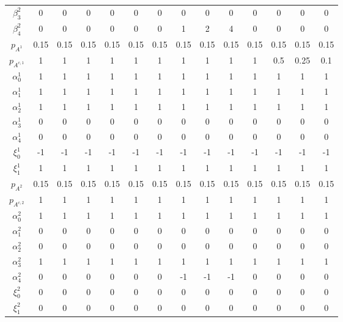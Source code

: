 \documentclass[12pt,a4paper]{article}
\theoremstyle{definition}
\begin{document}
\begin{table}
\begin{threeparttable}
\begin{tabular}{c c c c c c c c c c c c c c}
      $\beta^2_3$ & 0 & 0 & 0 & 0 & 0 & 0 & 0 & 0 & 0 & 0 & 0 & 0 & 0 \\
      $\beta^2_4$ & 0 & 0 & 0 & 0 & 0 & 0 & 1 & 2 & 4 & 0 & 0 & 0 & 0 \\
      $p_{A^{1}}$ & 0.15 & 0.15 & 0.15 & 0.15 & 0.15 & 0.15 & 0.15 & 0.15 & 0.15 & 0.15 & 0.15 & 0.15 & 0.15 \\
      $p_{A^{c, 1}}$ & 1 & 1 & 1 & 1 & 1 & 1 & 1 & 1 & 1 & 1 & 0.5 & 0.25 & 0.1 \\
      $\alpha^1_0$ & 1 & 1 & 1 & 1 & 1 & 1 & 1 & 1 & 1 & 1 & 1 & 1 & 1 \\
      $\alpha^1_1$ & 1 & 1 & 1 & 1 & 1 & 1 & 1 & 1 & 1 & 1 & 1 & 1 & 1 \\
      $\alpha^1_2$ & 1 & 1 & 1 & 1 & 1 & 1 & 1 & 1 & 1 & 1 & 1 & 1 & 1 \\
      $\alpha^1_3$ & 0 & 0 & 0 & 0 & 0 & 0 & 0 & 0 & 0 & 0 & 0 & 0 & 0 \\
      $\alpha^1_4$ & 0 & 0 & 0 & 0 & 0 & 0 & 0 & 0 & 0 & 0 & 0 & 0 & 0 \\
      $\xi^1_0$ & -1 & -1 & -1 & -1 & -1 & -1 & -1 & -1 & -1 & -1 & -1 & -1 & -1 \\
      $\xi^1_1$ & 1 & 1 & 1 & 1 & 1 & 1 & 1 & 1 & 1 & 1 & 1 & 1 & 1 \\
      $p_{A^{2}}$ & 0.15 & 0.15 & 0.15 & 0.15 & 0.15 & 0.15 & 0.15 & 0.15 & 0.15 & 0.15 & 0.15 & 0.15 & 0.15 \\
      $p_{A^{c, 2}}$ & 1 & 1 & 1 & 1 & 1 & 1 & 1 & 1 & 1 & 1 & 1 & 1 & 1 \\
      $\alpha^2_0$ & 1 & 1 & 1 & 1 & 1 & 1 & 1 & 1 & 1 & 1 & 1 & 1 & 1 \\
      $\alpha^2_1$ & 0 & 0 & 0 & 0 & 0 & 0 & 0 & 0 & 0 & 0 & 0 & 0 & 0 \\
      $\alpha^2_2$ & 0 & 0 & 0 & 0 & 0 & 0 & 0 & 0 & 0 & 0 & 0 & 0 & 0 \\
      $\alpha^2_3$ & 1 & 1 & 1 & 1 & 1 & 1 & 1 & 1 & 1 & 1 & 1 & 1 & 1 \\
      $\alpha^2_4$ & 0 & 0 & 0 & 0 & 0 & 0 & -1 & -1 & -1 & 0 & 0 & 0 & 0 \\
      $\xi^2_0$ & 0 & 0 & 0 & 0 & 0 & 0 & 0 & 0 & 0 & 0 & 0 & 0 & 0 \\
      $\xi^2_1$ & 0 & 0 & 0 & 0 & 0 & 0 & 0 & 0 & 0 & 0 & 0 & 0 & 0 \\
      \bottomrule
      \end{tabular}
  \end{threeparttable}
\end{table}



\printbibliography
\end{document}
